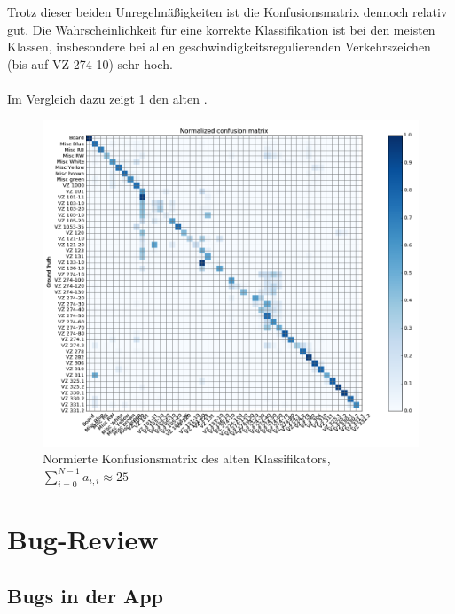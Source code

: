 \documentclass[12pt,a4paper,ngerman,enabledeprecatedfontcommands]{scrreprt}
\begin{document}
Trotz dieser beiden Unregelmäßigkeiten ist die Konfusionsmatrix dennoch relativ gut. Die Wahrscheinlichkeit für eine korrekte \gls{Klassifikation} ist bei den meisten Klassen, insbesondere bei allen geschwindigkeitsregulierenden Verkehrszeichen (bis auf \gls{VZ} 274-10) sehr hoch. \\\\
Im Vergleich dazu zeigt \cref{fig:konfusionsmatrix_alt} den alten .

\begin{figure}[H]
\centering
\includegraphics[width=1\linewidth]{Reviewdokument/Grafiken/Konfusionsmatrix_alt.png}
\caption{Normierte Konfusionsmatrix des alten Klassifikators, $\sum\limits_{i=0}^{N-1}a_{i,i} \approx 25$}
\label{fig:konfusionsmatrix_alt}
\end{figure}

\chapter{Bug-Review}

\section{Bugs in der App}
\end{document}

